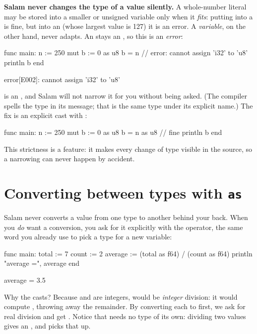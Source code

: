 \begin{warn}
\textbf{Salam never changes the type of a value silently.} A whole-number
literal may be stored into a smaller or unsigned variable only when it
\emph{fits}: putting  into a  is fine, but into an 
(whose largest value is 127) it is an error. A \emph{variable}, on the other
hand, never adapts. An  stays an , so this is an
\emph{error}:
\begin{salamen}
func main:
    n := 250
    mut b := 0 as u8
    b = n            // error: cannot assign 'i32' to 'u8'
    println b
end
\end{salamen}
\begin{shell}
error[E002]: cannot assign 'i32' to 'u8'
\end{shell}
 is an , and Salam will not narrow it for you without being
asked. (The compiler spells the type  in its message; that is the same
type under its explicit name.) The fix is an explicit cast with :
\begin{salamen}
func main:
    n := 250
    mut b := 0 as u8
    b = n as u8      // fine
    println b
end
\end{salamen}
This strictness is a feature: it makes every change of type visible in the
source, so a narrowing can never happen by accident.
\end{warn}

\section{Converting between types with \texttt{as}}

Salam never converts a value from one type to another behind your back. When you
\emph{do} want a conversion, you ask for it explicitly with the 
operator, the same word you already use to pick a type for a new variable:

\begin{salamen}
func main:
    total := 7
    count := 2
    average := (total as f64) / (count as f64)
    println "average =", average
end
\end{salamen}

\begin{progout}
average = 3.5
\end{progout}

Why the casts? Because  and  are integers,
 would be \emph{integer} division: it would compute
, throwing away the remainder. By converting each to  first, we
ask for real division and get . Notice that  needs no
type of its own: dividing two  values gives an , and
\code{:=} picks that up.

